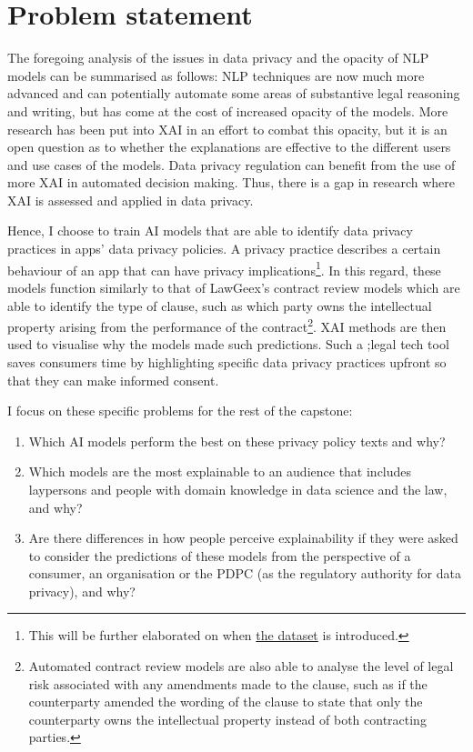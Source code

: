 \section{Problem statement}
The foregoing analysis of the issues in data privacy and the opacity of NLP models can be summarised as follows: NLP techniques are now much more advanced and can potentially automate some areas of substantive legal reasoning and writing, but has come at the cost of increased opacity of the models. More research has been put into XAI in an effort to combat this opacity, but it is an open question as to whether the explanations are effective to the different users and use cases of the models. Data privacy regulation can benefit from the use of more XAI in automated decision making. Thus, there is a gap in research where XAI is assessed and applied in data privacy. 

Hence, I choose to train AI models that are able to identify data privacy practices in apps' data privacy policies. A privacy practice describes a certain behaviour of an app that can have privacy implications\footnote{This will be further elaborated on when \hyperref[app350_corpus]{the dataset} is introduced.}. In this regard, these models function similarly to that of LawGeex's contract review models which are able to identify the type of clause, such as which party owns the intellectual property arising from the performance of the contract\footnote{Automated contract review models are also able to analyse the level of legal risk associated with any amendments made to the clause, such as if the counterparty amended the wording of the clause to state that only the counterparty owns the intellectual property instead of both contracting parties.}. XAI methods are then used to visualise why the models made such predictions. Such a ;legal tech tool saves consumers time by highlighting specific data privacy practices upfront so that they can make informed consent. 

I focus on these specific problems for the rest of the capstone:

\begin{enumerate}
  \item Which AI models perform the best on these privacy policy texts and why?
  \item Which models are the most explainable to an audience that includes laypersons and people with domain knowledge in data science and the law, and why?
  \item Are there differences in how people perceive explainability if they were asked to consider the predictions of these models from the perspective of a consumer, an organisation or the PDPC (as the regulatory authority for data privacy), and why?
\end{enumerate}

